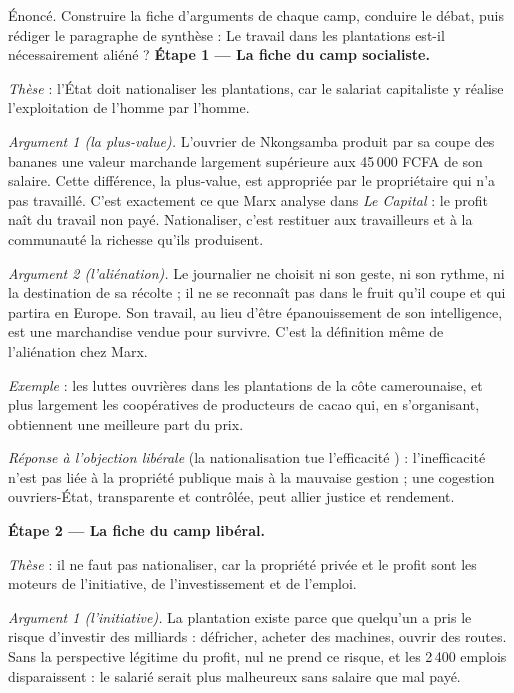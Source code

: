 \documentclass[11pt]{article}
\newcommand{\cle}[1]{{\popxbold\color{popdark}#1}}
\begin{document}
\begin{exoresolu}
Énoncé. Construire la fiche d'arguments de chaque camp, conduire le débat, puis rédiger le paragraphe de synthèse : \guillemotleft Le travail dans les plantations est-il nécessairement aliéné ? \guillemotright
\tcblower
\textbf{Étape 1 — La fiche du camp socialiste.}

\emph{Thèse} : l'État doit nationaliser les plantations, car le salariat capitaliste y réalise l'exploitation de l'homme par l'homme.

\emph{Argument 1 (la plus-value).} L'ouvrier de Nkongsamba produit par sa coupe des bananes une valeur marchande largement supérieure aux 45\,000 FCFA de son salaire. Cette différence, la \cle{plus-value}, est appropriée par le propriétaire qui n'a pas travaillé. C'est exactement ce que Marx analyse dans \emph{Le Capital} : le profit naît du travail non payé. Nationaliser, c'est restituer aux travailleurs et à la communauté la richesse qu'ils produisent.

\emph{Argument 2 (l'aliénation).} Le journalier ne choisit ni son geste, ni son rythme, ni la destination de sa récolte ; il ne se reconnaît pas dans le fruit qu'il coupe et qui partira en Europe. Son travail, au lieu d'être épanouissement de son intelligence, est une marchandise vendue pour survivre. C'est la définition même de l'aliénation chez Marx.

\emph{Exemple} : les luttes ouvrières dans les plantations de la côte camerounaise, et plus largement les coopératives de producteurs de cacao qui, en s'organisant, obtiennent une meilleure part du prix.

\emph{Réponse à l'objection libérale} (\guillemotleft la nationalisation tue l'efficacité \guillemotright) : l'inefficacité n'est pas liée à la propriété publique mais à la mauvaise gestion ; une cogestion ouvriers-État, transparente et contrôlée, peut allier justice et rendement.

\textbf{Étape 2 — La fiche du camp libéral.}

\emph{Thèse} : il ne faut pas nationaliser, car la propriété privée et le profit sont les moteurs de l'initiative, de l'investissement et de l'emploi.

\emph{Argument 1 (l'initiative).} La plantation existe parce que quelqu'un a pris le risque d'investir des milliards : défricher, acheter des machines, ouvrir des routes. Sans la perspective légitime du profit, nul ne prend ce risque, et les 2\,400 emplois disparaissent : le salarié serait plus malheureux sans salaire que mal payé.


\end{exoresolu}
\end{document}
